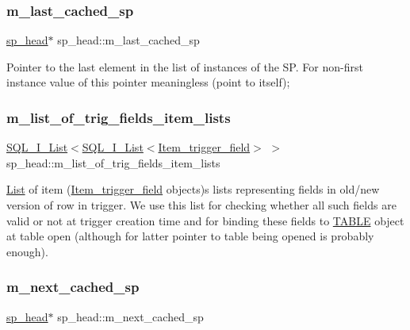 \subsubsection{\texorpdfstring{m\+\_\+last\+\_\+cached\+\_\+sp}{m\_last\_cached\_sp}}
{\footnotesize\ttfamily \mbox{\hyperlink{classsp__head}{sp\+\_\+head}}$\ast$ sp\+\_\+head\+::m\+\_\+last\+\_\+cached\+\_\+sp}

Pointer to the last element in the list of instances of the SP. For non-\/first instance value of this pointer meaningless (point to itself); \mbox{\label{classsp__head_a55085dcc463202909164fe39c4f7bad9}} 
\subsubsection{\texorpdfstring{m\+\_\+list\+\_\+of\+\_\+trig\+\_\+fields\+\_\+item\+\_\+lists}{m\_list\_of\_trig\_fields\_item\_lists}}
{\footnotesize\ttfamily \mbox{\hyperlink{classSQL__I__List}{S\+Q\+L\+\_\+\+I\+\_\+\+List}}$<$\mbox{\hyperlink{classSQL__I__List}{S\+Q\+L\+\_\+\+I\+\_\+\+List}}$<$\mbox{\hyperlink{classItem__trigger__field}{Item\+\_\+trigger\+\_\+field}}$>$ $>$ sp\+\_\+head\+::m\+\_\+list\+\_\+of\+\_\+trig\+\_\+fields\+\_\+item\+\_\+lists}

\mbox{\hyperlink{classList}{List}} of item (\mbox{\hyperlink{classItem__trigger__field}{Item\+\_\+trigger\+\_\+field}} objects)\textquotesingle{}s lists representing fields in old/new version of row in trigger. We use this list for checking whether all such fields are valid or not at trigger creation time and for binding these fields to \mbox{\hyperlink{structTABLE}{T\+A\+B\+LE}} object at table open (although for latter pointer to table being opened is probably enough). \mbox{\label{classsp__head_ac847a6b14ed40b05c7587891b419adc3}} 
\subsubsection{\texorpdfstring{m\+\_\+next\+\_\+cached\+\_\+sp}{m\_next\_cached\_sp}}
{\footnotesize\ttfamily \mbox{\hyperlink{classsp__head}{sp\+\_\+head}}$\ast$ sp\+\_\+head\+::m\+\_\+next\+\_\+cached\+\_\+sp}

